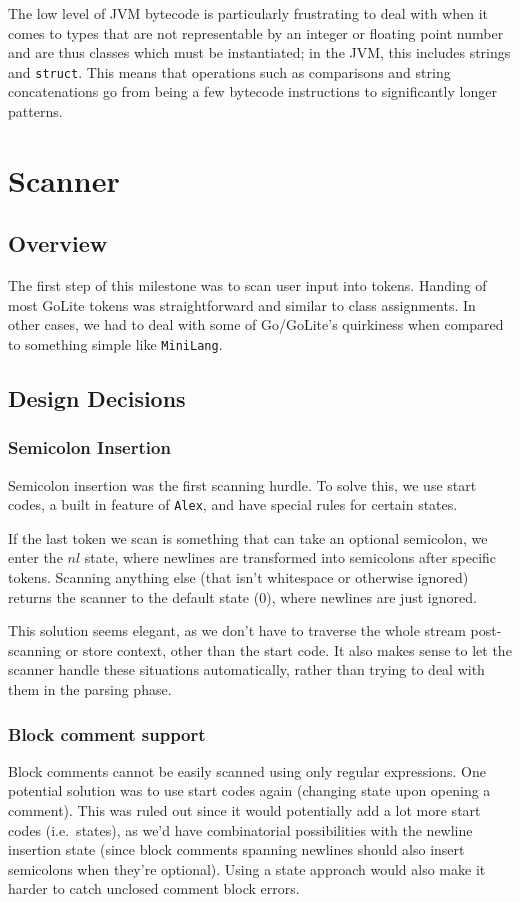 \documentclass[11pt]{article}
\begin{document}
The low level of JVM bytecode is particularly frustrating to deal with
when it comes to types that are not representable by an integer or
floating point number and are thus classes which must be instantiated;
in the JVM, this includes strings and \texttt{struct}. This means that operations
such as comparisons and string concatenations go from being a few
bytecode instructions to significantly longer patterns.
\section{Scanner}
\subsection{Overview}
The first step of this milestone was to scan user input into
tokens. Handing of most GoLite tokens was straightforward and similar
to class assignments. In other cases, we had to deal with some of
Go/GoLite's quirkiness when compared to something simple like
\texttt{MiniLang}.

\subsection{Design Decisions}
\subsubsection{Semicolon Insertion}
Semicolon insertion was the first scanning hurdle. To solve this, we
use start codes, a built in feature of \texttt{Alex}, and have special
rules for certain states.

If the last token we scan is something that can take an optional
semicolon, we enter the \(nl\) state, where newlines are transformed
into semicolons after specific tokens. Scanning anything else (that
isn't whitespace or otherwise ignored) returns the scanner to the
default state (\(0\)), where newlines are just ignored.

This solution seems elegant, as we don't have to traverse the whole
stream post-scanning or store context, other than the start code. It
also makes sense to let the scanner handle these situations
automatically, rather than trying to deal with them in the parsing
phase.
\subsubsection{Block comment support}
Block comments cannot be easily scanned using only regular
expressions. One potential solution was to use start codes again
(changing state upon opening a comment). This was ruled out since it
would potentially add a lot more start codes (i.e.\ states), as we'd
have combinatorial possibilities with the newline insertion state
(since block comments spanning newlines should also insert semicolons
when they're optional). Using a state approach would also make it
harder to catch unclosed comment block errors.
\end{document}
